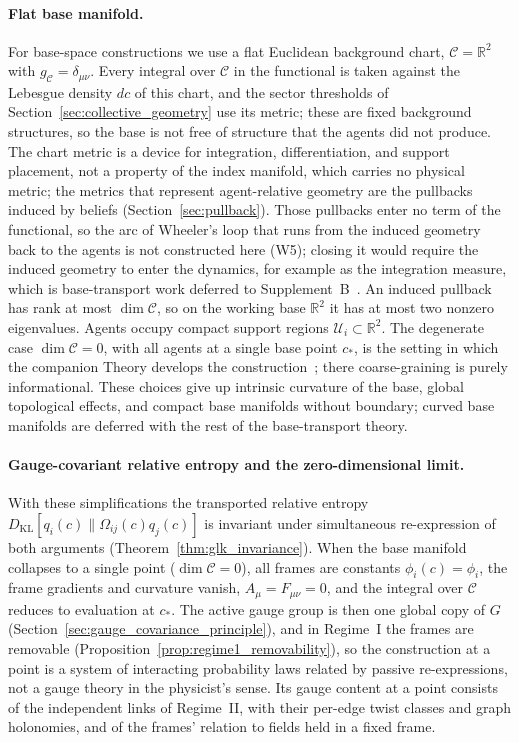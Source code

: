 \paragraph{Flat base manifold.}
\label{sec:flat_base}
For base-space constructions we use a flat Euclidean background chart, $\mathcal{C} = \mathbb{R}^2$ with $g_{\mathcal{C}} = \delta_{\mu\nu}$. Every integral over $\mathcal{C}$ in the functional is taken against the Lebesgue density $dc$ of this chart, and the sector thresholds of Section~\ref{sec:collective_geometry} use its metric; these are fixed background structures, so the base is not free of structure that the agents did not produce. The chart metric is a device for integration, differentiation, and support placement, not a property of the index manifold, which carries no physical metric; the metrics that represent agent-relative geometry are the pullbacks induced by beliefs (Section~\ref{sec:pullback}). Those pullbacks enter no term of the functional, so the arc of Wheeler's loop that runs from the induced geometry back to the agents is not constructed here (W5); closing it would require the induced geometry to enter the dynamics, for example as the integration measure, which is base-transport work deferred to Supplement~B~\cite{DennisGaugeVFESuppB2026}. An induced pullback has rank at most $\dim\mathcal{C}$, so on the working base $\mathbb{R}^2$ it has at most two nonzero eigenvalues. Agents occupy compact support regions $\mathcal{U}_i \subset \mathbb{R}^2$. The degenerate case $\dim\mathcal{C}=0$, with all agents at a single base point $c_*$, is the setting in which the companion Theory develops the construction~\cite[Ch.~2]{DennisGaugeVFE2026}; there coarse-graining is purely informational. These choices give up intrinsic curvature of the base, global topological effects, and compact base manifolds without boundary; curved base manifolds are deferred with the rest of the base-transport theory.

\paragraph{Gauge-covariant relative entropy and the zero-dimensional limit.}
With these simplifications the transported relative entropy $D_{\mathrm{KL}}[q_i(c) \| \Omega_{ij}(c)q_j(c)]$ is invariant under simultaneous re-expression of both arguments (Theorem~\ref{thm:glk_invariance}). When the base manifold collapses to a single point ($\dim\mathcal{C} = 0$), all frames are constants $\phi_i(c) = \phi_i$, the frame gradients and curvature vanish, $A_\mu = F_{\mu\nu} = 0$, and the integral over $\mathcal{C}$ reduces to evaluation at $c_*$. The active gauge group is then one global copy of $G$ (Section~\ref{sec:gauge_covariance_principle}), and in Regime~I the frames are removable (Proposition~\ref{prop:regime1_removability}), so the construction at a point is a system of interacting probability laws related by passive re-expressions, not a gauge theory in the physicist's sense. Its gauge content at a point consists of the independent links of Regime~II, with their per-edge twist classes and graph holonomies, and of the frames' relation to fields held in a fixed frame.

